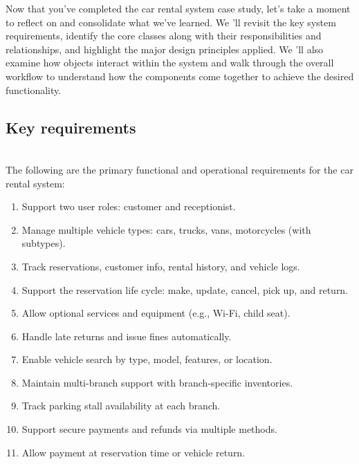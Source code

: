 

Now that you've completed the car rental system case study, let's take a moment to reflect on and consolidate what we've learned. We 'll revisit the key system requirements, identify the core classes along with their responsibilities and relationships, and highlight the major design principles applied. We
'll also examine how objects interact within the system and walk through the overall workflow to understand how the components come together to achieve the desired functionality.

\subsection{Key requirements}\label{Iq7WPedOPmehRiTvv77-s}
\\
The following are the primary functional and operational requirements for the car rental system:

\begin{enumerate}
\item
\protect{}\label{QOzOm-08UQHqSkjTwoUNE}
Support two user roles: customer and receptionist.
\item
\protect{}\label{HVlyr9hIkBoaGFeaRA7IZ}
Manage multiple vehicle types: cars, trucks, vans, motorcycles (with subtypes).
\item
\protect{}\label{aNA1r4dG87pj5LvDqYHfP}
Track reservations, customer info, rental history, and vehicle logs.
\item
\protect{}\label{zPCdJYdvASkLPzxGVL6oZ}
Support the reservation life cycle: make, update, cancel, pick up, and return.
\item
\protect{}\label{7vWXd9oMRM4GMMX2NlNH2}
Allow optional services and equipment (e.g., Wi-Fi, child seat).
\item
\protect{}\label{Di-6Jbz3H9DHIoIWJ1irf}
Handle late returns and issue fines automatically.
\item
\protect{}\label{SytP-OlLWDXVc_wbjQs_d}
Enable vehicle search by type, model, features, or location.
\item
\protect{}\label{1wMsQb--ESyUj3tIMds-v}
Maintain multi-branch support with branch-specific inventories.
\item
\protect{}\label{rLE1fgfgq_I4vh4BbyO8u}
Track parking stall availability at each branch.
\item
\protect{}\label{PX9hsI6YBIyJ9M2uTvxmX}
Support secure payments and refunds via multiple methods.
\item
\protect{}\label{lr727NVwKS-9dXxEswQGg}
Allow payment at reservation time or vehicle return.
\end{enumerate}


